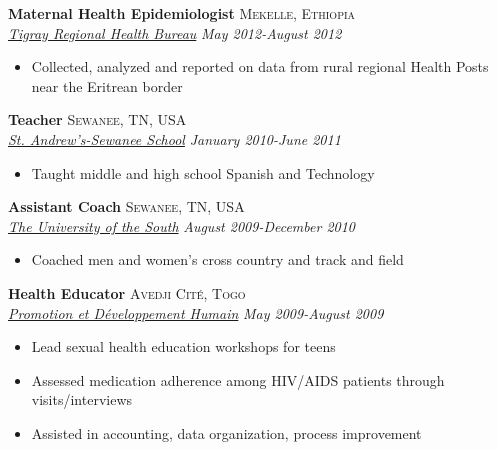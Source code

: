 \documentclass[11pt]{article}
\begin{document}
\noindent \textbf{Maternal Health Epidemiologist} \hfill \textsc{Mekelle, Ethiopia}\\
\noindent \emph{\href{http://www.moh.gov.et/tigrayhb}{Tigray Regional Health Bureau}} \hfill \emph{May 2012-August 2012}
\vspace{-2mm}
\begin{itemize}\itemsep0pt \parskip0pt 
\item Collected, analyzed and reported on data from rural regional Health Posts near the Eritrean border
\end{itemize}

\noindent \textbf{Teacher} \hfill \textsc{Sewanee, TN, USA}\\
\noindent \emph{\href{http://www.sasweb.org/}{St. Andrew's-Sewanee School}} \hfill \emph{January 2010-June 2011}
\vspace{-2mm}
\begin{itemize}\itemsep0pt \parskip0pt 
\item Taught middle and high school Spanish and Technology
\end{itemize}

\noindent \textbf{Assistant Coach} \hfill \textsc{Sewanee, TN, USA}\\
\noindent \emph{\href{http://sewanee.edu/}{The University of the South}} \hfill \emph{August 2009-December 2010}
\vspace{-2mm}
\begin{itemize}\itemsep0pt \parskip0pt 
\item Coached men and women's cross country and track and field
\end{itemize}

\noindent \textbf{Health Educator} \hfill \textsc{Avedji Cité, Togo}\\
\noindent \emph{\href{http://www.pdh-togo.org/html/english/welcome.html}{Promotion et Développement Humain}} \hfill \emph{May 2009-August 2009}
\vspace{-2mm}
\begin{itemize}\itemsep0pt \parskip0pt 
\item Lead sexual health education workshops for teens
\item Assessed medication adherence among HIV/AIDS patients through visits/interviews
\item Assisted in accounting, data organization, process improvement

\end{itemize}
\end{document}
